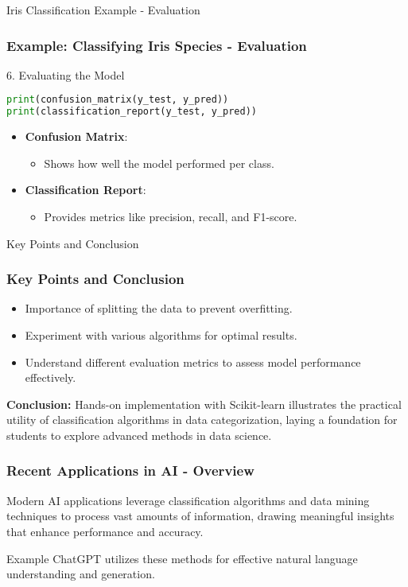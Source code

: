 \documentclass[aspectratio=169]{beamer}
\begin{document}
\begin{frame}[fragile]{Iris Classification Example - Evaluation}
    \frametitle{Example: Classifying Iris Species - Evaluation}
    
    \begin{block}{6. Evaluating the Model}
        \begin{lstlisting}[language=Python]
print(confusion_matrix(y_test, y_pred))
print(classification_report(y_test, y_pred))
        \end{lstlisting}
    \end{block}

    \begin{itemize}
        \item \textbf{Confusion Matrix}:
        \begin{itemize}
            \item Shows how well the model performed per class.
        \end{itemize}
        \item \textbf{Classification Report}:
        \begin{itemize}
            \item Provides metrics like precision, recall, and F1-score.
        \end{itemize}
    \end{itemize}
\end{frame}

\begin{frame}{Key Points and Conclusion}
    \frametitle{Key Points and Conclusion}
    \begin{itemize}
        \item Importance of splitting the data to prevent overfitting.
        \item Experiment with various algorithms for optimal results.
        \item Understand different evaluation metrics to assess model performance effectively.
    \end{itemize}
    
    \textbf{Conclusion:}
    Hands-on implementation with Scikit-learn illustrates the practical utility of classification algorithms in data categorization, laying a foundation for students to explore advanced methods in data science.
\end{frame}

\begin{frame}[fragile]
    \frametitle{Recent Applications in AI - Overview}
    Modern AI applications leverage classification algorithms and data mining techniques to process vast amounts of information, drawing meaningful insights that enhance performance and accuracy. 
    \begin{block}{Example}
        ChatGPT utilizes these methods for effective natural language understanding and generation.
    \end{block}
\end{frame}
\end{document}
